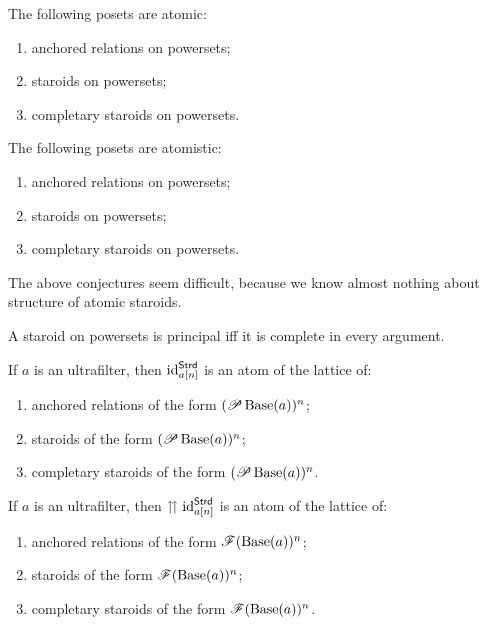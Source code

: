 \begin{conjecture}
The following posets are atomic:
\begin{enumerate}
\item anchored relations on powersets;
\item staroids on powersets;
\item completary staroids on powersets.
\end{enumerate}


\begin{conjecture}
The following posets are atomistic:
\begin{enumerate}
\item anchored relations on powersets;
\item staroids on powersets;
\item completary staroids on powersets.
\end{enumerate}
\end{conjecture}
\end{conjecture}
The above conjectures seem difficult, because we know almost nothing
about structure of atomic staroids.
\begin{conjecture}
A staroid on powersets is principal iff it is complete in every argument.
\end{conjecture}

\begin{conjecture}
If $a$ is an ultrafilter, then $\operatorname{id}_{a[n]}^{\mathsf{Strd}}$ is an
atom of the lattice of:
\begin{enumerate}
\item anchored relations of the form $(\mathscr{P}\operatorname{Base}(a))^{n}$;
\item staroids of the form $(\mathscr{P}\operatorname{Base}(a))^{n}$;
\item completary staroids of the form $(\mathscr{P}\operatorname{Base}(a))^{n}$.
\end{enumerate}
\end{conjecture}

\begin{conjecture}
If $a$ is an ultrafilter, then $\upuparrows\operatorname{id}_{a[n]}^{\mathsf{Strd}}$
is an atom of the lattice of:
\begin{enumerate}
\item anchored relations of the form $\mathscr{F}(\operatorname{Base}(a))^{n}$;
\item staroids of the form $\mathscr{F}(\operatorname{Base}(a))^{n}$;
\item completary staroids of the form $\mathscr{F}(\operatorname{Base}(a))^{n}$.
\end{enumerate}
\end{conjecture}

